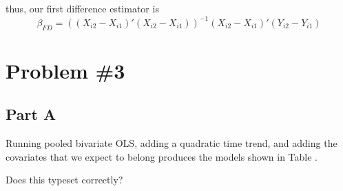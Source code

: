\documentclass[letterpaper, 12pt]{article}
\begin{document}
thus, our first difference estimator is
\begin{equation}
\widehat{\beta_{FD}}=((X_{i2}-X_{i1})'(X_{i2}-X_{i1}))^{-1} (X_{i2}-X_{i1})'(Y_{i2}-Y_{i1})
\end{equation}

\section{Problem \#3}
\subsection{Part A}
Running pooled bivariate OLS, adding a quadratic time trend, and adding the covariates that we expect to belong produces the models shown in Table .

Does this typeset correctly?
\end{document}
